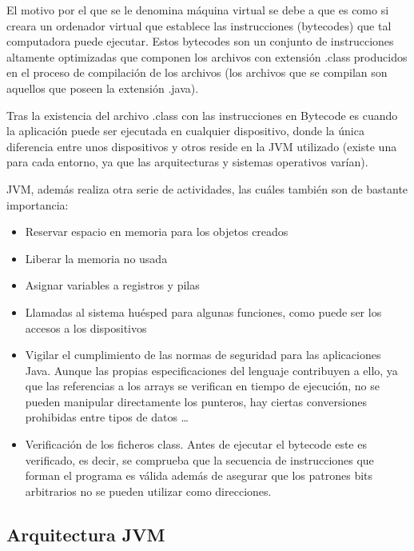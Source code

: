 \documentclass[english,runningheads,a4paper]{llncs}[2018/03/10]
\begin{document}
El motivo por el que se le denomina máquina virtual se debe a que es como si creara un ordenador virtual que establece las instrucciones (bytecodes) que tal computadora puede ejecutar. Estos bytecodes son un conjunto de instrucciones altamente optimizadas que componen los archivos con extensión .class producidos en el proceso de compilación de los archivos (los archivos que se compilan son aquellos que poseen la extensión .java).

Tras la existencia del archivo .class con las instrucciones en Bytecode es cuando la aplicación puede ser ejecutada en cualquier dispositivo, donde la única diferencia entre unos dispositivos y otros reside en la JVM utilizado (existe una para cada entorno, ya que las arquitecturas y sistemas operativos varían).

JVM, además realiza otra serie de actividades, las cuáles también son de bastante importancia: 
\begin{itemize}
    \item Reservar espacio en memoria para los objetos creados
    \item Liberar la memoria no usada
    \item Asignar variables a registros y pilas
    \item Llamadas al sistema huésped para algunas funciones, como puede ser los accesos a los dispositivos
    \item Vigilar el cumplimiento de las normas de seguridad para las aplicaciones Java. Aunque las propias especificaciones del lenguaje contribuyen a ello, ya que las referencias a los arrays se verifican en tiempo de ejecución, no se pueden manipular directamente los punteros, hay ciertas conversiones prohibidas entre tipos de datos \ldots
    \item Verificación de los ficheros class. Antes de ejecutar el bytecode este es verificado, es decir, se comprueba que la secuencia de instrucciones que forman el programa es válida además de asegurar que los patrones bits arbitrarios no se pueden utilizar como direcciones.
\end{itemize}

\subsection{Arquitectura JVM}
\end{document}
